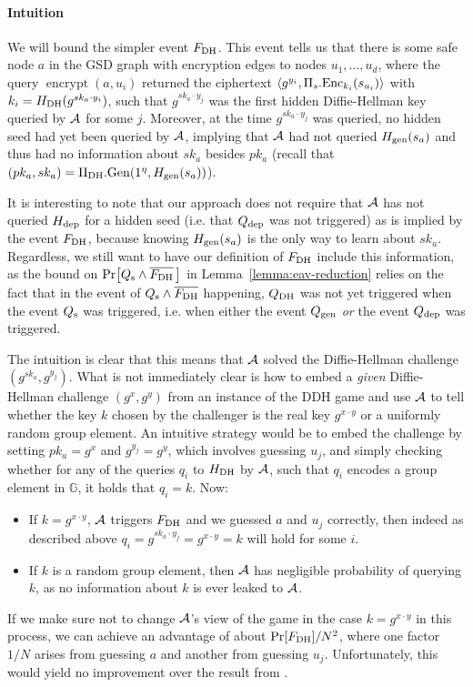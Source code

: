 \paragraph{Intuition} We will bound the simpler event $F_\mathrm{DH}$. This event tells us that there is some safe node $a$ in the GSD graph with encryption edges to nodes $u_1, \ldots, u_d$, where the query $\operatorname{encrypt}(a, u_i)$ returned the ciphertext $\langle g^{y_i}, \Pi_s.\mathrm{Enc}_{k_i}(s_{u_i}) \rangle$ with $k_i = H_\mathrm{DH}(g^{sk_{a} \cdot y_i})$, such that $g^{sk_a \cdot y_j}$ was the first hidden Diffie-Hellman key queried by $\mathcal{A}$ for some $j$.
Moreover, at the time $g^{sk_a \cdot y_j}$ was queried, no hidden seed had yet been queried by $\mathcal{A}$, implying that $\mathcal{A}$ had not queried $H_\mathrm{gen}(s_a)$ and thus had no information about $sk_a$ besides $pk_a$ (recall that $(pk_a, sk_a) = \Pi_{\mathrm{DH}}.\mathrm{Gen}(1^\eta, H_\mathrm{gen}(s_a))$).

It is interesting to note that our approach does not require that $\mathcal{A}$ has not queried $H_\mathrm{dep}$ for a hidden seed (i.e. that $Q_\mathrm{dep}$ was not triggered) as is implied by the event $F_\mathrm{DH}$, because knowing $H_\mathrm{gen}(s_a)$ is the only way to learn about $sk_a$. Regardless, we still want to have our definition of $F_\mathrm{DH}$ include this information, as the bound on $\pr{\qs \land \overline{\fdh} \,}$ in Lemma~\ref{lemma:eav-reduction} relies on the fact that in the event of $Q_\mathrm{s} \land \overline{F_\mathrm{DH}}$ happening,  $Q_\mathrm{DH}$ was not yet triggered when the event $Q_\mathrm{s}$ was triggered, i.e. when either the event $Q_\mathrm{gen}$ \emph{or} the event $Q_\mathrm{dep}$ was triggered.

The intuition is clear that this means that $\mathcal{A}$ solved the Diffie-Hellman challenge $(g^{sk_a}, g^{y_j})$. What is not immediately clear is how to embed a \emph{given} Diffie-Hellman challenge $(g^x, g^y)$ from an instance of the DDH game and use $\mathcal{A}$ to tell whether the key $k$ chosen by the challenger is the real key $g^{x \cdot y}$ or a uniformly random group element.
An intuitive strategy would be to embed the challenge by setting $pk_a = g^x$ and $g^{y_j} = g^y$, which involves guessing $u_j$, and simply checking whether for any of the queries $q_i$ to $H_\mathrm{DH}$ by $\mathcal{A}$, such that $q_i$ encodes a group element in $\mathbb{G}$, it holds that $q_i = k$. Now:
\begin{itemize}
	\item If $k = g^{x \cdot y}$, $\mathcal{A}$ triggers $F_\mathrm{DH}$ and we guessed $a$ and $u_j$ correctly, then indeed as described above $q_i = g^{sk_a \cdot y_j} = g^{x \cdot y} = k$ will hold for some $i$.
	\item If $k$ is a random group element, then $\mathcal{A}$ has negligible probability of querying $k$, as no information about $k$ is ever leaked to $\mathcal{A}$.
\end{itemize}
If we make sure not to change $\mathcal{A}$'s view of the game in the case $k = g^{x \cdot y}$ in this process, we can achieve an advantage of about $\pr{\fdh} / N^2$, where one factor $1/N$ arises from guessing $a$ and another from guessing $u_j$. Unfortunately, this would yield no improvement over the result from \cite{ttkem}.

